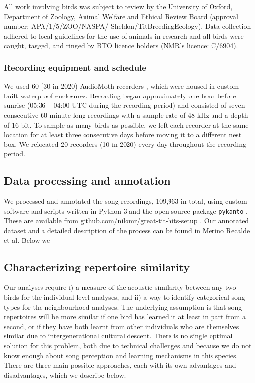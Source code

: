 \documentclass[9pt, onecolumn, twoside, lineno]{gsajnl}
\begin{document}
All work involving birds was subject to review by the University of Oxford, Department of Zoology, Animal Welfare and Ethical Review Board (approval number: APA/1/5/ZOO/NASPA/ Sheldon/TitBreedingEcology). Data collection adhered to local guidelines for the use of animals in research and all birds were caught, tagged, and ringed by BTO licence holders (NMR's licence: C/6904).

\subsubsection{Recording equipment and schedule}
We used 60 (30 in 2020) AudioMoth recorders \autocite{hill2019}, which were housed in custom-built waterproof enclosures. Recording began approximately one hour before sunrise (05:36 -- 04:00 UTC during the recording period) and consisted of seven consecutive 60-minute-long recordings with a sample rate of 48 kHz and a depth of 16-bit. To sample as many birds as possible, we left each recorder at the same location for at least three consecutive days before moving it to a different nest box. We relocated 20 recorders (10 in 2020) every day throughout the recording period.

\subsection{Data processing and annotation}

We processed and annotated the song recordings, 109,963 in total, using custom software and scripts written in Python 3 \autocite{vanrossum1995} and the open source package \texttt{pykanto} \autocite{merinorecalde2023}. These are available from \href{https://github.com/nilomr/great-tit-hits-setup}{github.com/nilomr/great-tit-hits-setup} \autocite{nilo_gretidataset_setup_2023}. Our annotated dataset and a detailed description of the process can be found in Merino Recalde et al\autocite{merinorecalde2023a}. Below we

\subsection{Characterizing repertoire similarity}

Our analyses require i) a measure of the acoustic similarity between any two birds for the individual-level analyses, and ii) a way to identify categorical song types for the neighbourhood analyses. The underlying assumption is that song repertoires will be more similar if one bird has learned it at least in part from a second, or if they have both learnt from other individuals who are themselves similar due to intergenerational cultural descent. There is no single optimal solution for this problem, both due to technical challenges and because we do not know enough about song perception and learning mechanisms in this species. There are three main possible approaches, each with its own advantages and disadvantages, which we describe below.
\end{document}
